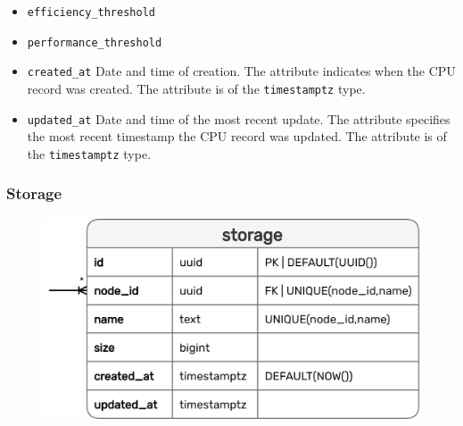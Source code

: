 \begin{itemize}
  \item \texttt{efficiency\_threshold}
    \newline

  \item \texttt{performance\_threshold}
    \newline

  \item \texttt{created\_at}
    \newline
    Date and time of creation.
    \newline
    The attribute indicates when the CPU record was created.
    \newline
    The attribute is of the \texttt{timestamptz} type.

  \item \texttt{updated\_at}
    \newline
    Date and time of the most recent update.
    \newline
    The attribute specifies the most recent timestamp the CPU record was updated.
    \newline
    The attribute is of the \texttt{timestamptz} type.
\end{itemize}

\subsubsection{Storage}
\label{subsubsec:implementation_server_database_storage}

\begin{figure}
  \centering
  \includegraphics[width=\linewidth]{images/implementation/erm_storage.png}
\end{figure}

